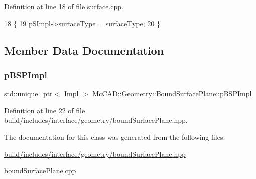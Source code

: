 Definition at line 18 of file surface.\+cpp.


\begin{DoxyCode}
18                                                                 \{
19   \hyperlink{classMcCAD_1_1Geometry_1_1Surface_a0097d4e9bfc1c7cd7cd33d81492b9100}{pSImpl}->surfaceType = surfaceType;
20 \}
\end{DoxyCode}


\subsection{Member Data Documentation}
\mbox{\label{classMcCAD_1_1Geometry_1_1BoundSurfacePlane_a4e6fab5cba3cc226ad29f679bd3886ce}} 
\subsubsection{\texorpdfstring{p\+B\+S\+P\+Impl}{pBSPImpl}}
{\footnotesize\ttfamily std\+::unique\+\_\+ptr$<$ \hyperlink{classMcCAD_1_1Geometry_1_1BoundSurfacePlane_1_1Impl}{Impl} $>$ Mc\+C\+A\+D\+::\+Geometry\+::\+Bound\+Surface\+Plane\+::p\+B\+S\+P\+Impl\hspace{0.3cm}{\ttfamily [private]}}



Definition at line 22 of file build/includes/interface/geometry/bound\+Surface\+Plane.\+hpp.



The documentation for this class was generated from the following files\+:\begin{DoxyCompactItemize}
\item 
\hyperlink{build_2includes_2interface_2geometry_2boundSurfacePlane_8hpp}{build/includes/interface/geometry/bound\+Surface\+Plane.\+hpp}\item 
\hyperlink{boundSurfacePlane_8cpp}{bound\+Surface\+Plane.\+cpp}\end{DoxyCompactItemize}
